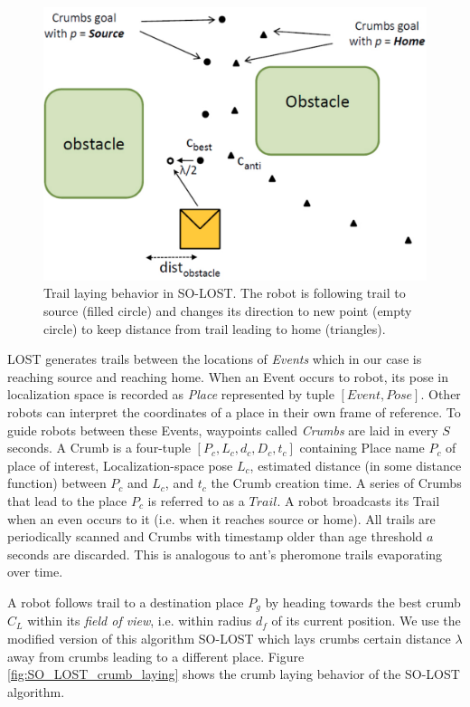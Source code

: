 \documentclass[letterpaper, 10 pt, conference]{ieeeconf}  %
\begin{document}
\begin{figure}
   \includegraphics[width=0.9\linewidth]{SO_LOST_crumb_laying.png}
   \centering
   \caption{Trail laying behavior in SO-LOST. The robot is following trail to source (filled circle) and changes its direction to new point (empty circle) to keep distance from trail leading to home (triangles).}
   \label{fig:SO_LOST_crumbnexist_laying}
\end{figure}

LOST generates trails between the locations of \emph{Events} which in our case is reaching source and reaching home. When an Event occurs to robot, its pose in localization space is recorded as \emph{Place} represented by tuple $[Event, Pose]$. Other robots can interpret the coordinates of a place in their own frame of reference. To guide robots between these Events, waypoints called \emph{Crumbs} are laid in every $S$ seconds. A Crumb is a four-tuple $[P_c, L_c, d_c, D_c, t_c]$ containing Place name $P_c$ of place of interest, Localization-space pose $L_c$, estimated distance (in some distance function) between $P_c$ and $L_c$, and $t_c$ the Crumb creation time. A series of Crumbs that lead to the place $P_c$ is referred to as a $Trail$. A robot broadcasts its Trail when an even occurs to it (i.e. when it reaches source or home). All trails are periodically scanned and Crumbs with timestamp older than age threshold $a$ seconds are discarded. This is analogous to ant's pheromone trails evaporating over time.

A robot follows trail to a destination place $P_g$ by heading towards the best crumb $C_L$ within its \emph{field of view}, i.e. within radius $d_f$ of its current position. We use the modified version of this algorithm SO-LOST which lays crumbs certain distance $\lambda$ away from crumbs leading to a different place. Figure \ref{fig:SO_LOST_crumb_laying} shows the crumb laying behavior of the SO-LOST algorithm. 
\end{document}
